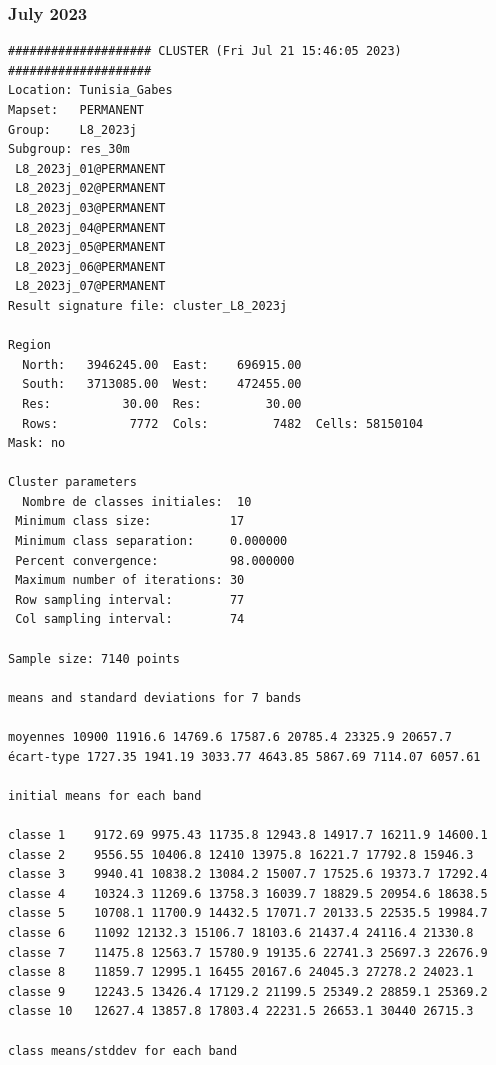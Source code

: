 \documentclass[land,article,submit,pdftex,moreauthors]{Definitions/mdpi}
\begin{document}
\subsubsection[\appendixname~\thesubsubsection]{July 2023}
\begin{scriptsize}
\begin{verbatim}
#################### CLUSTER (Fri Jul 21 15:46:05 2023) ####################
Location: Tunisia_Gabes
Mapset:   PERMANENT
Group:    L8_2023j
Subgroup: res_30m
 L8_2023j_01@PERMANENT
 L8_2023j_02@PERMANENT
 L8_2023j_03@PERMANENT
 L8_2023j_04@PERMANENT
 L8_2023j_05@PERMANENT
 L8_2023j_06@PERMANENT
 L8_2023j_07@PERMANENT
Result signature file: cluster_L8_2023j

Region
  North:   3946245.00  East:    696915.00
  South:   3713085.00  West:    472455.00
  Res:          30.00  Res:         30.00
  Rows:          7772  Cols:         7482  Cells: 58150104
Mask: no

Cluster parameters
  Nombre de classes initiales: 	10
 Minimum class size:           17
 Minimum class separation:     0.000000
 Percent convergence:          98.000000
 Maximum number of iterations: 30
 Row sampling interval:        77
 Col sampling interval:        74

Sample size: 7140 points

means and standard deviations for 7 bands

moyennes 10900 11916.6 14769.6 17587.6 20785.4 23325.9 20657.7
écart-type 1727.35 1941.19 3033.77 4643.85 5867.69 7114.07 6057.61

initial means for each band

classe 1    9172.69 9975.43 11735.8 12943.8 14917.7 16211.9 14600.1
classe 2    9556.55 10406.8 12410 13975.8 16221.7 17792.8 15946.3
classe 3    9940.41 10838.2 13084.2 15007.7 17525.6 19373.7 17292.4
classe 4    10324.3 11269.6 13758.3 16039.7 18829.5 20954.6 18638.5
classe 5    10708.1 11700.9 14432.5 17071.7 20133.5 22535.5 19984.7
classe 6    11092 12132.3 15106.7 18103.6 21437.4 24116.4 21330.8
classe 7    11475.8 12563.7 15780.9 19135.6 22741.3 25697.3 22676.9
classe 8    11859.7 12995.1 16455 20167.6 24045.3 27278.2 24023.1
classe 9    12243.5 13426.4 17129.2 21199.5 25349.2 28859.1 25369.2
classe 10   12627.4 13857.8 17803.4 22231.5 26653.1 30440 26715.3

class means/stddev for each band


\end{verbatim}
\end{scriptsize}
\end{document}
